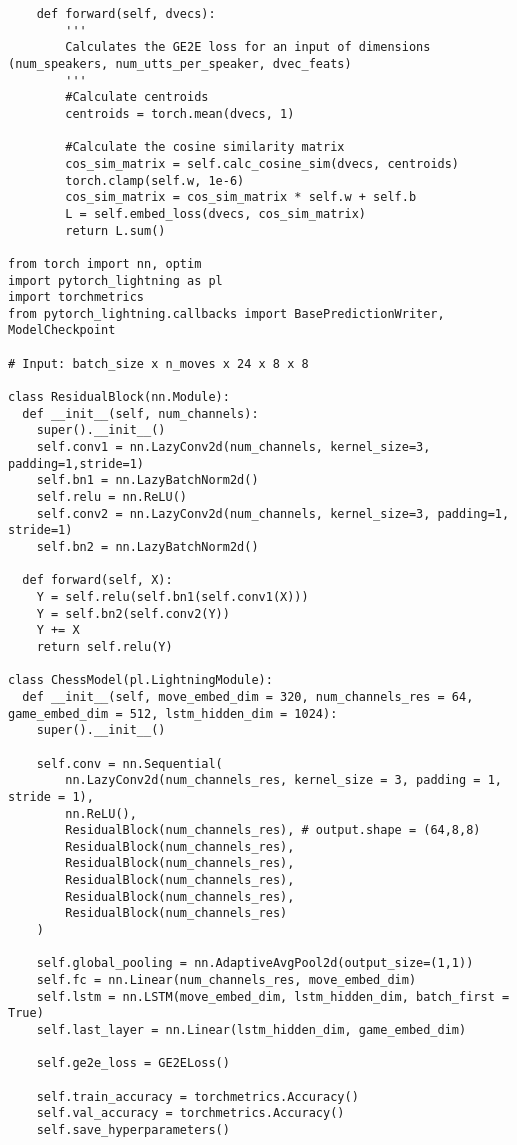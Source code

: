 \begin{verbatim}
    def forward(self, dvecs):
        '''
        Calculates the GE2E loss for an input of dimensions (num_speakers, num_utts_per_speaker, dvec_feats)
        '''
        #Calculate centroids
        centroids = torch.mean(dvecs, 1)

        #Calculate the cosine similarity matrix
        cos_sim_matrix = self.calc_cosine_sim(dvecs, centroids)
        torch.clamp(self.w, 1e-6)
        cos_sim_matrix = cos_sim_matrix * self.w + self.b
        L = self.embed_loss(dvecs, cos_sim_matrix)
        return L.sum()

from torch import nn, optim
import pytorch_lightning as pl
import torchmetrics
from pytorch_lightning.callbacks import BasePredictionWriter, ModelCheckpoint

# Input: batch_size x n_moves x 24 x 8 x 8

class ResidualBlock(nn.Module):
  def __init__(self, num_channels):
    super().__init__()
    self.conv1 = nn.LazyConv2d(num_channels, kernel_size=3, padding=1,stride=1)
    self.bn1 = nn.LazyBatchNorm2d()
    self.relu = nn.ReLU()
    self.conv2 = nn.LazyConv2d(num_channels, kernel_size=3, padding=1, stride=1)
    self.bn2 = nn.LazyBatchNorm2d()

  def forward(self, X):
    Y = self.relu(self.bn1(self.conv1(X)))
    Y = self.bn2(self.conv2(Y))
    Y += X
    return self.relu(Y)

class ChessModel(pl.LightningModule):
  def __init__(self, move_embed_dim = 320, num_channels_res = 64, game_embed_dim = 512, lstm_hidden_dim = 1024):
    super().__init__()
    
    self.conv = nn.Sequential(
        nn.LazyConv2d(num_channels_res, kernel_size = 3, padding = 1, stride = 1),
        nn.ReLU(),
        ResidualBlock(num_channels_res), # output.shape = (64,8,8)
        ResidualBlock(num_channels_res),
        ResidualBlock(num_channels_res),
        ResidualBlock(num_channels_res),
        ResidualBlock(num_channels_res),
        ResidualBlock(num_channels_res)
    )

    self.global_pooling = nn.AdaptiveAvgPool2d(output_size=(1,1))
    self.fc = nn.Linear(num_channels_res, move_embed_dim)
    self.lstm = nn.LSTM(move_embed_dim, lstm_hidden_dim, batch_first = True)
    self.last_layer = nn.Linear(lstm_hidden_dim, game_embed_dim)

    self.ge2e_loss = GE2ELoss()

    self.train_accuracy = torchmetrics.Accuracy()
    self.val_accuracy = torchmetrics.Accuracy()
    self.save_hyperparameters()


\end{verbatim}
